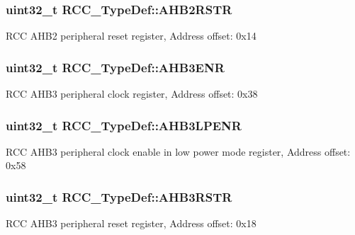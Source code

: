 \subsubsection[{\texorpdfstring{A\+H\+B2\+R\+S\+TR}{AHB2RSTR}}]{ uint32\+\_\+t R\+C\+C\+\_\+\+Type\+Def\+::\+A\+H\+B2\+R\+S\+TR}\hypertarget{struct_r_c_c___type_def_a343e0230ded55920ff2a04fbde0e5bcd}{}\label{struct_r_c_c___type_def_a343e0230ded55920ff2a04fbde0e5bcd}
R\+CC A\+H\+B2 peripheral reset register, Address offset\+: 0x14 
\subsubsection[{\texorpdfstring{A\+H\+B3\+E\+NR}{AHB3ENR}}]{ uint32\+\_\+t R\+C\+C\+\_\+\+Type\+Def\+::\+A\+H\+B3\+E\+NR}\hypertarget{struct_r_c_c___type_def_ad4ea7be562b42e2ae1a84db44121195d}{}\label{struct_r_c_c___type_def_ad4ea7be562b42e2ae1a84db44121195d}
R\+CC A\+H\+B3 peripheral clock register, Address offset\+: 0x38 
\subsubsection[{\texorpdfstring{A\+H\+B3\+L\+P\+E\+NR}{AHB3LPENR}}]{ uint32\+\_\+t R\+C\+C\+\_\+\+Type\+Def\+::\+A\+H\+B3\+L\+P\+E\+NR}\hypertarget{struct_r_c_c___type_def_a95edda857c3725bfb410d3a4707edfd8}{}\label{struct_r_c_c___type_def_a95edda857c3725bfb410d3a4707edfd8}
R\+CC A\+H\+B3 peripheral clock enable in low power mode register, Address offset\+: 0x58 
\subsubsection[{\texorpdfstring{A\+H\+B3\+R\+S\+TR}{AHB3RSTR}}]{ uint32\+\_\+t R\+C\+C\+\_\+\+Type\+Def\+::\+A\+H\+B3\+R\+S\+TR}\hypertarget{struct_r_c_c___type_def_a39a90d838fbd0b8515f03e4a1be6374f}{}\label{struct_r_c_c___type_def_a39a90d838fbd0b8515f03e4a1be6374f}
R\+CC A\+H\+B3 peripheral reset register, Address offset\+: 0x18 
